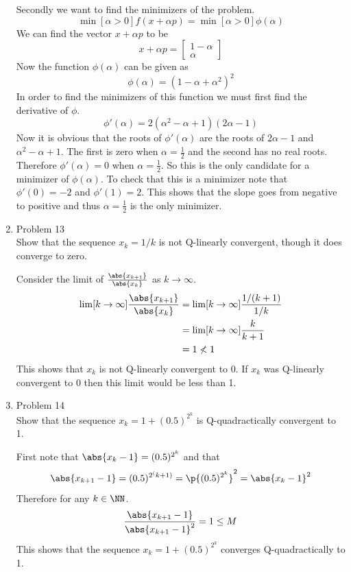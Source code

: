 \documentclass[11pt, oneside]{article}
\begin{document}
\begin{enumerate}
    Secondly we want to find the minimizers of the problem.
    \[
      \min[\alpha > 0]{f(x + \alpha p)} = \min[\alpha > 0]{\phi(\alpha)}
    \]
    We can find the vector $x + \alpha p$ to be
    \[
      x + \alpha p =
      \begin{bmatrix}
        1 - \alpha \\
        \alpha
      \end{bmatrix}
    \]
    Now the function $\phi(\alpha)$ can be given as
    \[
      \phi(\alpha) = (1 - \alpha + \alpha^2)^2
    \]
    In order to find the minimizers of this function we must first find the
    derivative of $\phi$.
    \[
      \phi'(\alpha) = 2(\alpha^2 - \alpha + 1)(2\alpha - 1)
    \]
    Now it is obvious that the roots of $\phi'(\alpha)$ are the roots of
    $2\alpha - 1$ and $\alpha^2 - \alpha + 1$.
    The first is zero when $\alpha = \frac{1}{2}$ and the second has no
    real roots.
    Therefore $\phi'(\alpha) = 0$ when $\alpha = \frac{1}{2}$.
    So this is the only candidate for a minimizer of $\phi(\alpha)$.
    To check that this is a minimizer note that $\phi'(0) = -2$ and $\phi'(1) = 2$.
    This shows that the slope goes from negative to positive and thus
    $\alpha = \frac{1}{2}$ is the only minimizer.

  \item %
    Problem 13 \\
    Show that the sequence $x_k = 1/k$ is not Q-linearly convergent,
    though it does converge to zero.

    Consider the limit of $\frac{\abs{x_{k+1}}}{\abs{x_k}}$ as $k \to \infty$.
    \begin{align*}
      \lim[k \to \infty]{\frac{\abs{x_{k+1}}}{\abs{x_k}}} &= \lim[k \to \infty]{\frac{1/(k+1)}{1/k}} \\
      &= \lim[k \to \infty]{\frac{k}{k+1}} \\
      &= 1 \nless 1
    \end{align*}
    This shows that $x_k$ is not Q-linearly convergent to 0.
    If $x_k$ was Q-linearly convergent to 0 then this limit would be less than 1.

  \item %
    Problem 14 \\
    Show that the sequence $x_k = 1 + (0.5)^{2^k}$ is Q-quadractically convergent
    to 1.

    First note that $\abs{x_k - 1} = (0.5)^{2^k}$ and that
    \[
      \abs{x_{k+1} - 1} = (0.5)^{2^(k+1)} = \p{(0.5)^{2^{k}}}^2 = \abs{x_k - 1}^2
    \]
    Therefore for any $k \in \NN$.
    \[
      \frac{\abs{x_{k+1} - 1}}{\abs{x_{k+1} - 1}^2} = 1 \le M
    \]
    This shows that the sequence $x_k = 1 + (0.5)^{2^k}$ converges
    Q-quadractically to 1.


\end{enumerate}
\end{document}

